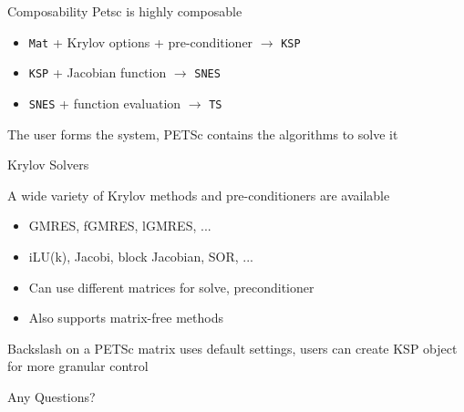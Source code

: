 \documentclass{beamer}
\begin{document}
\begin{frame}{Composability}
Petsc is highly composable
\begin{itemize}
  \item \texttt{Mat} + Krylov options + pre-conditioner $\rightarrow$ \texttt{KSP}
  \item \texttt{KSP} + Jacobian function $\rightarrow$ \texttt{SNES}
  \item \texttt{SNES} + function evaluation $\rightarrow$ \texttt{TS}
\end{itemize}
\hfill

The user forms the system, PETSc contains the algorithms to solve it
\end{frame}



\begin{frame}{Krylov Solvers}
\hfill

A wide variety of Krylov methods and pre-conditioners are available
\begin{itemize}
  \item GMRES, fGMRES, lGMRES, ...
  \item iLU(k), Jacobi, block Jacobian, SOR, ...
  \item Can use different matrices for solve, preconditioner
  \item Also supports matrix-free methods
\end{itemize}
\hfill

Backslash on a PETSc matrix uses default settings, users can create KSP object for more granular control
\end{frame}

\begin{frame}
\begin{center}  
Any Questions?
\end{center}

\end{frame}
\end{document}
